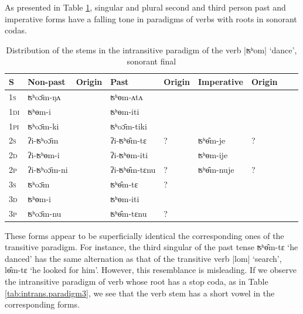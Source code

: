 \documentclass[oldfontcommands,oneside,a4paper,11pt]{article}
\newcommand{\ipa}[1]{{\phon \mbox{#1}}} %
\begin{document}
As presented in Table \ref{tab:intrans.paradigm2}, singular and plural second and third person past and imperative forms have a falling tone in paradigms of verbs with roots in sonorant codas.

\begin{table}[h]
\caption{Distribution of the stems in the intransitive paradigm of the verb |\ipa{ʦʰom}| `dance', sonorant final} \label{tab:intrans.paradigm2} \centering
\begin{tabular}{lllllllll}
\toprule
S & Non-past & Origin & Past & Origin & Imperative & Origin \\
\midrule
\textsc{1s} & \ipa{ʦʰoɔ̄m-ŋʌ} & & \ipa{ʦʰɵm-ʌtʌ} &\\
\textsc{1di} & \ipa{ʦʰɵm-i} && \ipa{ʦʰɵm-iti}& \\
\textsc{1pi} & \ipa{ʦʰoɔ̄m-ki} && \ipa{ʦʰoɔ̄m-tiki} &&\\
\textsc{2s} & \ipa{ʔi-ʦʰoɔ̄m} & &\ipa{ʔi-ʦʰɵ̂m-tɛ}  &?&\ipa{ʦʰɵ̂m-je}&?\\
\textsc{2d} & \ipa{ʔi-ʦʰɵm-i}  & &\ipa{ʔi-ʦʰɵm-iti} &&\ipa{ʦʰɵm-ije} &\\
\textsc{2p} & \ipa{ʔi-ʦʰoɔ̄m-ni} && \ipa{ʔi-ʦʰɵ̂m-tɛnu} &?&\ipa{ʦʰɵ̂m-nuje}&?\\
\textsc{3s} & \ipa{ʦʰoɔ̄m} & &\ipa{ʦʰɵ̂m-tɛ} &?\\
\textsc{3d} & \ipa{ʦʰɵm-i} & &\ipa{ʦʰɵm-iti} &\\
\textsc{3p} & \ipa{ʦʰoɔ̄m-nu} && \ipa{ʦʰɵ̂m-tɛnu} &?\\
\bottomrule
\end{tabular}
\end{table}

These forms appear to be superficially identical the corresponding ones of the transitive paradigm. For instance, the third singular of the past tense \ipa{ʦʰɵ̂m-tɛ} `he danced' has the same alternation as that of the transitive verb |\ipa{lom}| `search', \ipa{lɵ̂m-tɛ} `he looked for him'. However, this resemblance is misleading. If we observe the intransitive paradigm of verb whose root has a stop coda, as in Table \ref{tab:intrans.paradigm3}, we see that the verb stem has a short vowel in the corresponding forms.
\end{document}
